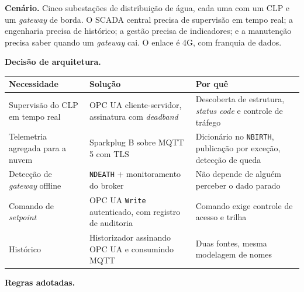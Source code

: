 \textbf{Cenário.} Cinco subestações de distribuição de água, cada uma com um CLP e um \emph{gateway} de borda. O SCADA central precisa de supervisão em tempo real; a engenharia precisa de histórico; a gestão precisa de indicadores; e a manutenção precisa saber quando um \emph{gateway} cai. O enlace é 4G, com franquia de dados.

\textbf{Decisão de arquitetura.}

\begin{longtable}[]{@{}
  >{\raggedright\arraybackslash}p{}
  >{\raggedright\arraybackslash}p{}
  >{\raggedright\arraybackslash}p{}@{}}
\toprule\noalign{}
\begin{minipage}[b]{\linewidth}\raggedright
Necessidade
\end{minipage} & \begin{minipage}[b]{\linewidth}\raggedright
Solução
\end{minipage} & \begin{minipage}[b]{\linewidth}\raggedright
Por quê
\end{minipage} \\
\midrule\noalign{}
\endhead
\bottomrule\noalign{}
\endlastfoot
Supervisão do CLP em tempo real & OPC UA cliente-servidor, assinatura com \emph{deadband} & Descoberta de estrutura, \emph{status code} e controle de tráfego \\
Telemetria agregada para a nuvem & Sparkplug B sobre MQTT 5 com TLS & Dicionário no \passthrough{\lstinline!NBIRTH!}, publicação por exceção, detecção de queda \\
Detecção de \emph{gateway} offline & \passthrough{\lstinline!NDEATH!} + monitoramento do broker & Não depende de alguém perceber o dado parado \\
Comando de \emph{setpoint} & OPC UA \passthrough{\lstinline!Write!} autenticado, com registro de auditoria & Comando exige controle de acesso e trilha \\
Histórico & Historizador assinando OPC UA e consumindo MQTT & Duas fontes, mesma modelagem de nomes \\
\end{longtable}

\textbf{Regras adotadas.}

